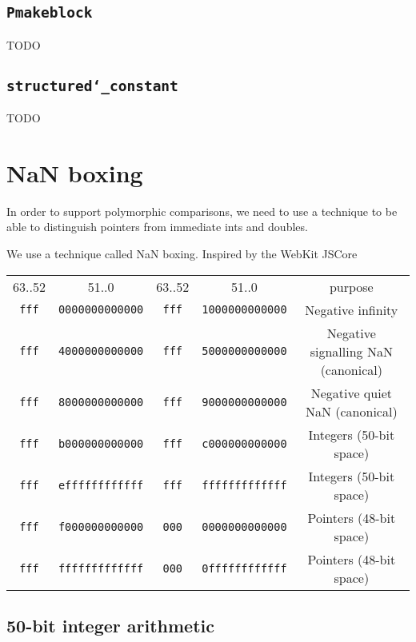 \documentclass[12pt,a4paper,twoside,openright]{report}
\begin{document}
\subsection{\texttt{Pmakeblock}}

TODO

\subsection{\texttt{structured\char`_constant}}

TODO

\section{NaN boxing}\label{nan-boxing}

In order to support polymorphic comparisons, we need to use a technique to be
able to distinguish pointers from immediate ints and doubles.

We use a technique called NaN boxing. Inspired by the WebKit JSCore

\begin{tabular}{c c | c c | c}
    63..52 & 51..0 & 63..52 & 51..0 & purpose \\
    \lstinline!fff! & \lstinline!0000000000000! & \lstinline!fff! & \lstinline!1000000000000! & Negative infinity \\
    \lstinline!fff! & \lstinline!4000000000000! & \lstinline!fff! & \lstinline!5000000000000! & Negative signalling NaN (canonical) \\
    \lstinline!fff! & \lstinline!8000000000000! & \lstinline!fff! & \lstinline!9000000000000! & Negative quiet NaN (canonical) \\
    \lstinline!fff! & \lstinline!b000000000000! & \lstinline!fff! & \lstinline!c000000000000! & Integers (50-bit space) \\
    \lstinline!fff! & \lstinline!effffffffffff! & \lstinline!fff! & \lstinline!fffffffffffff! & Integers (50-bit space) \\
    \lstinline!fff! & \lstinline!f000000000000! & \lstinline!000! & \lstinline!0000000000000! & Pointers (48-bit space) \\
    \lstinline!fff! & \lstinline!fffffffffffff! & \lstinline!000! & \lstinline!0ffffffffffff! & Pointers (48-bit space)
\end{tabular}

\subsection{50-bit integer arithmetic}\label{50-bit-integer}
\end{document}
